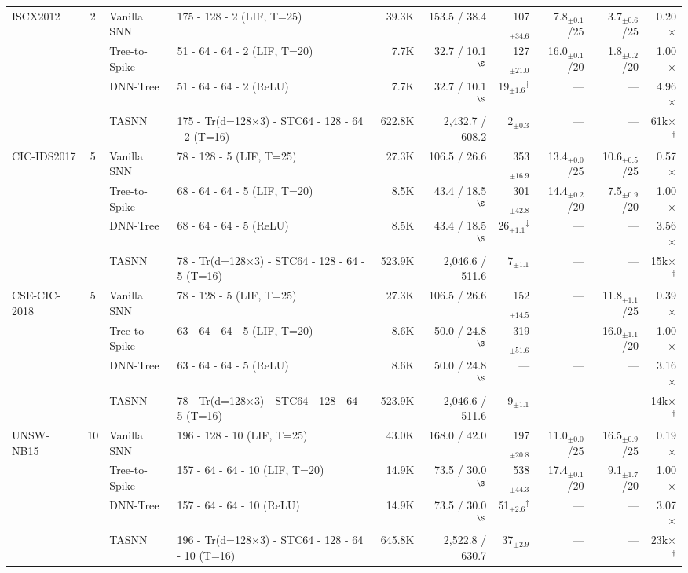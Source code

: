 \begin{table}[!ht]
{\begin{tabular}{l c l l r r r r r r}
\midrule
\multirow{4}{*}{ISCX2012} & \multirow{4}{*}{2}
  & Vanilla SNN   & 175 - 128 - 2 (LIF, T=25) & 39.3K & 153.5 / 38.4 & 107$_{\pm34.6}$ & 7.8$_{\pm0.1}$/25 & 3.7$_{\pm0.6}$/25 & 0.20$\times$ \\
& & Tree-to-Spike & 51 - 64 - 64 - 2 (LIF, T=20) & 7.7K & 32.7 / 10.1$^{\S}$ & 127$_{\pm21.0}$ & 16.0$_{\pm0.1}$/20 & 1.8$_{\pm0.2}$/20 & 1.00$\times$ \\
& & DNN-Tree      & 51 - 64 - 64 - 2 (ReLU) & 7.7K & 32.7 / 10.1$^{\S}$ & 19$_{\pm1.6}$$^\ddagger$ & --- & --- & 4.96$\times$ \\
& & TASNN         & 175 - Tr(d=128$\times$3) - STC64 - 128 - 64 - 2 (T=16) & 622.8K & 2,432.7 / 608.2 & 2$_{\pm0.3}$ & --- & --- & 61k$\times$$^\dagger$ \\
\midrule
\multirow{4}{*}{CIC-IDS2017} & \multirow{4}{*}{5}
  & Vanilla SNN   & 78 - 128 - 5 (LIF, T=25) & 27.3K & 106.5 / 26.6 & 353$_{\pm16.9}$ & 13.4$_{\pm0.0}$/25 & 10.6$_{\pm0.5}$/25 & 0.57$\times$ \\
& & Tree-to-Spike & 68 - 64 - 64 - 5 (LIF, T=20) & 8.5K & 43.4 / 18.5$^{\S}$ & 301$_{\pm42.8}$ & 14.4$_{\pm0.2}$/20 & 7.5$_{\pm0.9}$/20 & 1.00$\times$ \\
& & DNN-Tree      & 68 - 64 - 64 - 5 (ReLU) & 8.5K & 43.4 / 18.5$^{\S}$ & 26$_{\pm1.1}$$^\ddagger$ & --- & --- & 3.56$\times$ \\
& & TASNN         & 78 - Tr(d=128$\times$3) - STC64 - 128 - 64 - 5 (T=16) & 523.9K & 2,046.6 / 511.6 & 7$_{\pm1.1}$ & --- & --- & 15k$\times$$^\dagger$ \\
\midrule
\multirow{4}{*}{CSE-CIC-2018} & \multirow{4}{*}{5}
  & Vanilla SNN   & 78 - 128 - 5 (LIF, T=25) & 27.3K & 106.5 / 26.6 & 152$_{\pm14.5}$ & --- & 11.8$_{\pm1.1}$/25 & 0.39$\times$ \\
& & Tree-to-Spike & 63 - 64 - 64 - 5 (LIF, T=20) & 8.6K & 50.0 / 24.8$^{\S}$ & 319$_{\pm51.6}$ & --- & 16.0$_{\pm1.1}$/20 & 1.00$\times$ \\
& & DNN-Tree      & 63 - 64 - 64 - 5 (ReLU) & 8.6K & 50.0 / 24.8$^{\S}$ & --- & --- & --- & 3.16$\times$ \\
& & TASNN         & 78 - Tr(d=128$\times$3) - STC64 - 128 - 64 - 5 (T=16) & 523.9K & 2,046.6 / 511.6 & 9$_{\pm1.1}$ & --- & --- & 14k$\times$$^\dagger$ \\
\midrule
\multirow{4}{*}{UNSW-NB15} & \multirow{4}{*}{10}
  & Vanilla SNN   & 196 - 128 - 10 (LIF, T=25) & 43.0K & 168.0 / 42.0 & 197$_{\pm20.8}$ & 11.0$_{\pm0.0}$/25 & 16.5$_{\pm0.9}$/25 & 0.19$\times$ \\
& & Tree-to-Spike & 157 - 64 - 64 - 10 (LIF, T=20) & 14.9K & 73.5 / 30.0$^{\S}$ & 538$_{\pm44.3}$ & 17.4$_{\pm0.1}$/20 & 9.1$_{\pm1.7}$/20 & 1.00$\times$ \\
& & DNN-Tree      & 157 - 64 - 64 - 10 (ReLU) & 14.9K & 73.5 / 30.0$^{\S}$ & 51$_{\pm2.6}$$^\ddagger$ & --- & --- & 3.07$\times$ \\
& & TASNN         & 196 - Tr(d=128$\times$3) - STC64 - 128 - 64 - 10 (T=16) & 645.8K & 2,522.8 / 630.7 & 37$_{\pm2.9}$ & --- & --- & 23k$\times$$^\dagger$ \\
\bottomrule
\end{tabular}}
\end{table}
